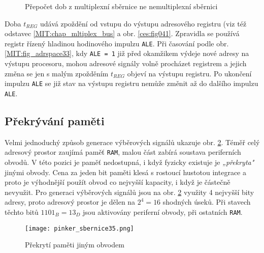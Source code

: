        \begin{figure}[ht!]
          \centering  
            {}
            {}
          \caption{Přepočet dob z multiplexní sběrnice ne nemultiplexní sběrnici}
          \label{MIT:fig_sbernice3334}
        \end{figure}
        
        Doba \(t_{REG}\) udává zpoždění od vstupu do výstupu adresového registru (viz též odstavec 
        \ref{MIT:chap_mltiplex_bus} a obr. \ref{ces:fig041}. Zpravidla se používá registr 
        řízený hladinou hodinového impulzu \texttt{ALE}. Při časování podle obr. 
        \ref{MIT:fig_adrspace33}, kdy \texttt{ALE = 1} již před okamžikem výdeje nové adresy na 
        výstupu procesoru, mohou adresové signály volně procházet registrem a jejich změna se jen s 
        malým zpožděním \(t_{REG}\) objeví na výstupu registru. Po ukončení impulzu \texttt{ALE} se 
        již stav na výstupu registru nemůže změnit až do dalšího impulzu \texttt{ALE}.

    \subsection{Překrývání paměti}
      Velmi jednoduchý způsob generace výběrových signálů ukazuje obr. \ref{MIT:fig_sbernice35}. 
      Téměř celý adresový prostor zaujímá paměť \texttt{RAM}, malou část zabírá soustava 
      periferních obvodů. V této pozici je paměť nedostupná, i když fyzicky existuje je 
      \emph{„překryta"} jinými obvody. Cena za jeden bit paměti klesá s rostoucí hustotou integrace 
      a proto je výhodnější použít obvod co nejvyšší kapacity, i když je částečně nevyužit. Pro 
      generaci výběrových signálů jsou na obr. \ref{MIT:fig_sbernice35} využity 4 nejvyšší bity 
      adresy, proto adresový prostor je dělen na \(2^4 = 16\) shodných úseků. Při stavech těchto 
      bitů \(1101_B = 13_D\) jsou aktivovány periferní obvody, při ostatních \texttt{RAM}.
    
      \begin{figure}[ht!] %
        \centering
        \texttt{[image: pinker\_sbernice35.png]}
        \caption{Překrytí paměti jiným obvodem}
        \label{MIT:fig_sbernice35}
      \end{figure}
      
